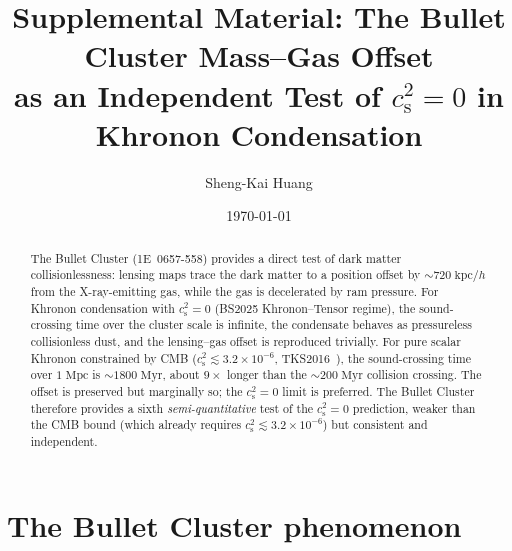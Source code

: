 \documentclass[prd,twocolumn,superscriptaddress,longbibliography,floatfix]{revtex4-2}
\newcommand{\cs}{c_{\mathrm{s}}}
\begin{document}
\title{Supplemental Material: The Bullet Cluster
Mass--Gas Offset\\ as an Independent Test of $\cs^{2} = 0$
in Khronon Condensation}

\author{Sheng-Kai Huang}

\date{\today}

\begin{abstract}
The Bullet Cluster (1E~0657-558) provides a direct
test of dark matter collisionlessness: lensing maps
trace the dark matter to a position offset by
$\sim\!720\;\mathrm{kpc}/h$ from the X-ray-emitting
gas, while the gas is decelerated by ram pressure.
For Khronon condensation with $\cs^{2} = 0$
(BS2025 Khronon--Tensor regime), the sound-crossing
time over the cluster scale is infinite, the
condensate behaves as pressureless collisionless dust,
and the lensing--gas offset is reproduced trivially.
For pure scalar Khronon constrained by CMB
($\cs^{2} \lesssim 3.2 \times 10^{-6}$,
TKS2016~\cite{TKS2016}), the sound-crossing time over
$1\;\mathrm{Mpc}$ is $\sim 1800\;\mathrm{Myr}$,
about $9\times$ longer than the $\sim 200\;\mathrm{Myr}$
collision crossing.  The offset is preserved but
marginally so; the $\cs^{2} = 0$ limit is preferred.
The Bullet Cluster therefore provides a sixth
\emph{semi-quantitative} test of the
$\cs^{2} = 0$ prediction, weaker than the CMB bound
(which already requires $\cs^{2} \lesssim 3.2 \times
10^{-6}$) but consistent and independent.
\end{abstract}

\maketitle

\section{The Bullet Cluster phenomenon}
\label{sec:bullet}
\end{document}
